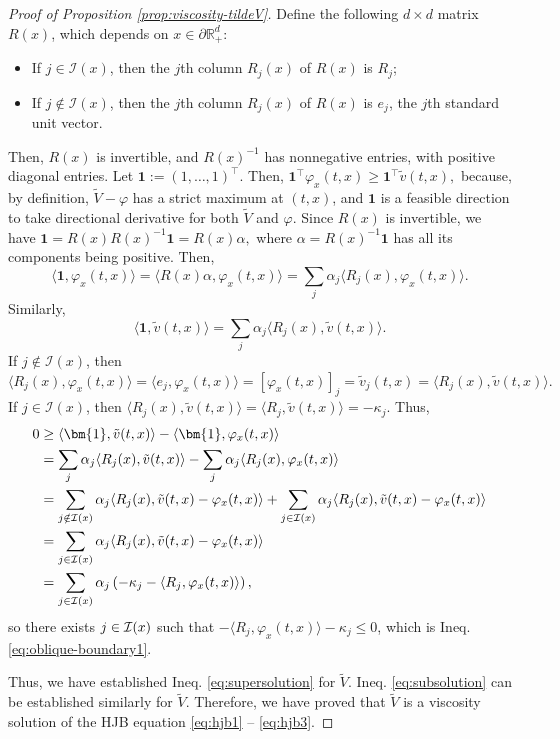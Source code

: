 \documentclass[11pt]{article}
\theoremstyle{definition}
\theoremstyle{plain}
\newcommand{\cI}{{\cal I}}
\newcommand{\bOne}{\bm{1}}
\begin{document}
\begin{proof}[Proof of Proposition \ref{prop:viscosity-tildeV}]
\medskip
\fi
Define the following $d\times d$ matrix \( R(x) \), which depends on \( x \in \partial \mathbb{R}_+^d \): 
\begin{itemize}
\item If \( j \in \mathcal{I}(x) \), then the \( j \)th column $R_j(x)$ of \( R(x) \) is \( R_j \);
\item If \( j \notin \mathcal{I}(x) \), then the \( j \)th column $R_j(x)$ of \( R(x) \) is \( e_j \), the $j$th standard unit vector.
\end{itemize}
Then, \( R(x) \) is invertible, and \( R(x)^{-1} \) has nonnegative entries, with positive diagonal entries.
Let \( \bOne := (1, \dots, 1)^{\top} \). Then,  
\(
\bOne^{\top}\varphi_x(t,x) \ge \bOne^{\top} \tilde{v}(t,x),
\)
because, by definition, \( \tilde{V} - \varphi \) has a strict maximum at \( (t,x) \), and $\bOne$ is a feasible direction 
to take directional derivative for both $\tilde V$ and $\varphi$.
Since $R(x)$ is invertible, we have
\(
\bOne = R(x) R(x)^{-1} \bOne = R(x) \alpha, 
\)
where $\alpha = R(x)^{-1} \bOne$ has all its components being positive. 
Then,
\[
\langle \bOne, \varphi_x(t,x) \rangle = \langle R(x) \alpha, \varphi_x(t,x) \rangle 
= \sum_j \alpha_j \langle R_j(x), \varphi_x(t,x) \rangle.
\]
Similarly, 
\[
\langle \bOne, \tilde v(t,x) \rangle 
= \sum_j \alpha_j \langle R_j(x), \tilde v(t,x) \rangle.
\]
If \( j \notin \mathcal{I}(x) \), then
\(
\langle R_j(x), \varphi_x(t,x) \rangle = \langle e_j, \varphi_x(t,x) \rangle = \left[\varphi_x(t,x)\right]_j= \tilde{v}_j (t,x) = \langle R_j(x), \tilde v(t,x) \rangle.
\)
If \( j \in \mathcal{I}(x) \), then
\(
\langle R_j(x), \tilde{v}(t,x) \rangle = \langle R_j, \tilde{v}(t,x) \rangle = -\kappa_j.
\)
Thus,
\begin{align*}
0 & \geq \langle \bOne, \tilde v(t,x) \rangle - \langle \bOne, \varphi_x(t,x) \rangle \\
& = \sum_j \alpha_j \langle R_j(x), \tilde v(t,x) \rangle - \sum_j \alpha_j \langle R_j(x), \varphi_x(t,x) \rangle \\
& = \sum_{j \notin \cI(x)}\alpha_j \langle R_j(x), \tilde v(t,x)  - \varphi_x(t,x) \rangle + \sum_{j \in \cI(x)} \alpha_j \langle R_j(x), \tilde v(t,x)  - \varphi_x(t,x) \rangle \\
& = \sum_{j \in \cI(x)} \alpha_j \langle R_j(x), \tilde v(t,x)  - \varphi_x(t,x) \rangle \\
& = \sum_{j \in \cI(x)} \alpha_j \left(-\kappa_j - \langle R_j, \varphi_x(t,x) \rangle\right),
\end{align*}
so there exists \( j \in \cI(x) \) such that \( - \langle R_j, \varphi_x(t,x) \rangle  -\kappa_j \leq 0 \), which is Ineq. \eqref{eq:oblique-boundary1}.

Thus, we have established Ineq. \eqref{eq:supersolution} for \( \tilde{V} \). Ineq. \eqref{eq:subsolution} 
can be established similarly for $\tilde V$. Therefore, we have proved that $\tilde V$ is a viscosity solution of the HJB equation \eqref{eq:hjb1} -- \eqref{eq:hjb3}.
\end{proof}
\end{document}
